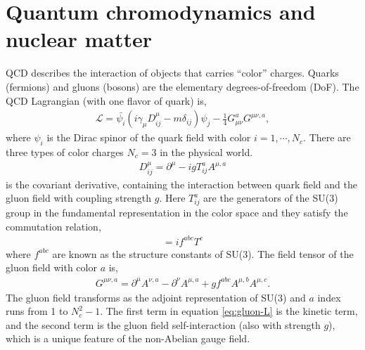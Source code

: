 \section{Quantum chromodynamics and nuclear matter}
QCD describes the interaction of objects that carries ``color'' charges.
Quarks (fermions) and gluons (bosons) are the elementary degrees-of-freedom (DoF). 
The QCD Lagrangian (with one flavor of quark) is,
\begin{eqnarray}
\mathcal{L} = \bar{\psi_i} \left(i\gamma_\mu D^\mu_{ij} -m \delta_{ij} \right)\psi_j - \frac{1}{4}G_{\mu\nu}^a G^{\mu\nu,a},
\end{eqnarray}
where $\psi_i$ is the Dirac spinor of the quark field with color $i=1,\cdots, N_c$. 
There are three types of color charges $N_c = 3$ in the physical world.
\begin{eqnarray}
D_{ij}^\mu = \partial^\mu - i g T_{ij}^a A^{\mu, a}
\end{eqnarray}
is the covariant derivative, containing the interaction between quark field and the gluon field with coupling strength $g$.
Here $T_{ij}^a$ are the generators of the SU(3) group in the fundamental representation in the color space and they satisfy the commutation relation,
\begin{eqnarray}
[T^a, T^b] = i f^{abc} T^c
\end{eqnarray}
where $f^{abc}$ are known as the structure constants of SU(3).
The field tensor of the gluon field with color $a$ is,
\begin{eqnarray}
G^{\mu\nu,a} = \partial^\mu A^{\nu, a} - \partial^\nu A^{\mu, a} + g f^{abc} A^{\mu,b}A^{\mu,c}. \label{eq:gluon-L}
\end{eqnarray}
The gluon field transforms as the adjoint representation of SU(3) and $a$ index runs from 1 to $N_c^2 - 1$.
The first term in equation \ref{eq:gluon-L} is the kinetic term, and the second term is the gluon field self-interaction (also with strength $g$), which is a unique feature of the non-Abelian gauge field.

